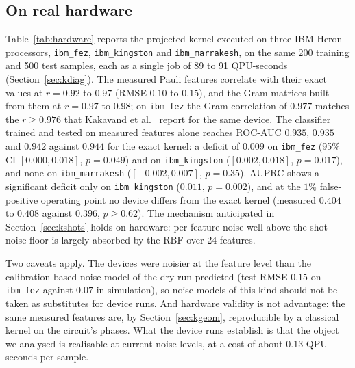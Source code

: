 \documentclass[preprint,11pt]{elsarticle}
\begin{document}
\subsection{On real hardware}\label{sec:khw}
Table~\ref{tab:hardware} reports the projected kernel executed on three IBM Heron processors,
\texttt{ibm\_fez}, \texttt{ibm\_kingston} and \texttt{ibm\_marrakesh}, on the same 200 training and 500
test samples, each as a single job of 89 to 91 QPU-seconds (Section~\ref{sec:kdiag}). The measured Pauli
features correlate with their exact values at $r=0.92$ to $0.97$ (RMSE $0.10$ to $0.15$), and the Gram
matrices built from them at $r=0.97$ to $0.98$; on \texttt{ibm\_fez} the Gram correlation of $0.977$
matches the $r\ge0.976$ that Kakavand et al.~\cite{kakavand2026benchmarking} report for the same device.
The classifier trained and tested on measured features alone reaches ROC-AUC $0.935$, $0.935$ and $0.942$
against $0.944$ for the exact kernel: a deficit of $0.009$ on \texttt{ibm\_fez} (95\% CI $[0.000,0.018]$,
$p=0.049$) and on \texttt{ibm\_kingston} ($[0.002,0.018]$, $p=0.017$), and none on \texttt{ibm\_marrakesh}
($[-0.002,0.007]$, $p=0.35$). AUPRC shows a significant deficit only on \texttt{ibm\_kingston} ($0.011$,
$p=0.002$), and at the $1\%$ false-positive operating point no device differs from the exact kernel
(measured $0.404$ to $0.408$ against $0.396$, $p\ge0.62$). The mechanism anticipated in
Section~\ref{sec:kshots} holds on hardware: per-feature noise well above the shot-noise floor is largely
absorbed by the RBF over 24 features.

Two caveats apply. The devices were noisier at the feature level than the calibration-based noise model
of the dry run predicted (test RMSE $0.15$ on \texttt{ibm\_fez} against $0.07$ in simulation), so noise
models of this kind should not be taken as substitutes for device runs. And hardware validity is not
advantage: the same measured features are, by Section~\ref{sec:kgeom}, reproducible by a classical kernel
on the circuit's phases. What the device runs establish is that the object we analysed is realisable at
current noise levels, at a cost of about $0.13$ QPU-seconds per sample.
\end{document}
